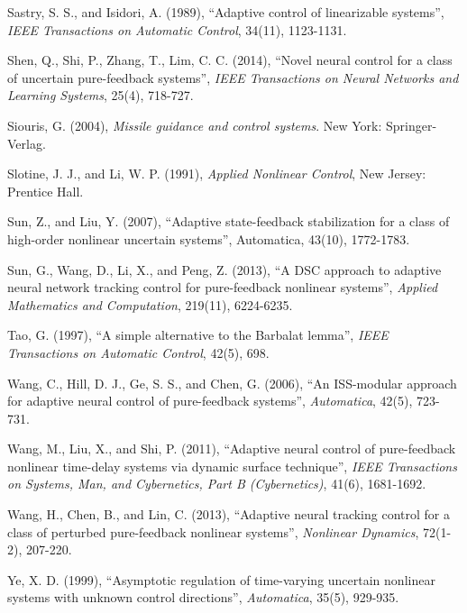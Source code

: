 \documentclass{tSYS2e}
\theoremstyle{plain}
\theoremstyle{definition}
\begin{document}
\begin{thebibliography}{99}
 Sastry, S. S., and Isidori,
A. (1989), ``Adaptive control of linearizable systems'', {\itshape IEEE Transactions on
Automatic Control}, 34(11), 1123-1131.

 Shen, Q., Shi, P., Zhang, T.,  Lim, C. C. (2014), ``Novel neural control for a class of uncertain
pure-feedback systems'', {\itshape IEEE
Transactions on Neural Networks and Learning Systems}, 25(4), 718-727.

 Siouris, G. (2004), {\itshape Missile guidance and control
systems}. New York: Springer-Verlag.

 Slotine, J. J., and Li, W.
P. (1991), {\itshape Applied Nonlinear Control}, New Jersey: Prentice Hall.

 Sun, Z., and Liu, Y. (2007),
``Adaptive state-feedback stabilization for a class of high-order nonlinear uncertain systems'', Automatica, 43(10), 1772-1783.

 Sun, G., Wang, D., Li, X., and
Peng, Z. (2013), ``A DSC approach to adaptive neural network tracking control
for pure-feedback nonlinear systems'', {\itshape Applied Mathematics and Computation},
219(11), 6224-6235.

  Tao, G. (1997),
``A simple alternative to the Barbalat lemma'', {\itshape IEEE Transactions on Automatic Control}, 42(5), 698.

 Wang, C., Hill, D. J., Ge, S.
S., and Chen, G. (2006), ``An ISS-modular approach for adaptive neural control
of pure-feedback systems'', {\itshape Automatica}, 42(5), 723-731.

Wang, M., Liu, X., and Shi, P. (2011), ``Adaptive neural control of pure-feedback nonlinear time-delay systems via dynamic surface technique'', {\itshape IEEE Transactions on Systems, Man, and Cybernetics, Part B (Cybernetics)}, 41(6), 1681-1692.

 Wang, H., Chen, B., and Lin, C.
(2013), ``Adaptive neural tracking control for a class of perturbed
pure-feedback nonlinear systems'', {\itshape Nonlinear Dynamics}, 72(1-2), 207-220.

 Ye, X. D. (1999), ``Asymptotic regulation of
time-varying uncertain nonlinear systems with unknown control directions'',
{\itshape Automatica}, 35(5), 929-935.


\end{thebibliography}
\end{document}
